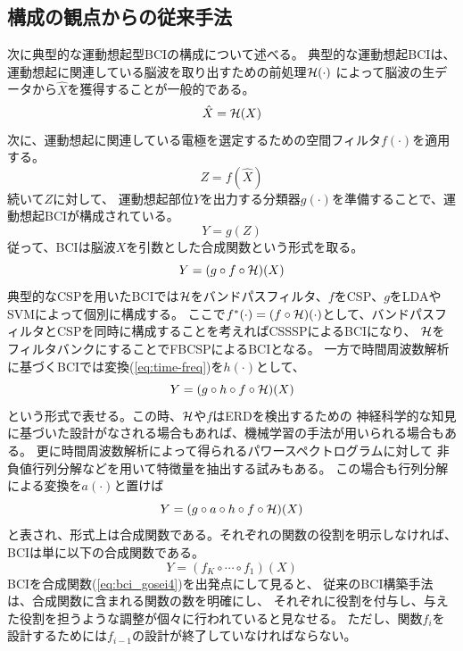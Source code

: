 \subsection{\mc 構成の観点からの従来手法}
次に典型的な運動想起型BCIの構成について述べる。
典型的な運動想起BCIは、運動想起に関連している脳波を取り出すための前処理\(\cal H(\cdot)\)
によって脳波の生データから\(\hat X\)を獲得することが一般的である。
\begin{equation}
    \hat X = {\cal H}(X)
    \label{eq:bandpass}
\end{equation}
次に、運動想起に関連している電極を選定するための空間フィルタ\(f(\cdot)\)を適用する。
\begin{equation}
    Z = f(\hat X)
    \label{eq:spatfilter}
\end{equation}
続いて\(Z\)に対して、
運動想起部位\(Y\)を出力する分類器\(g(\cdot)\)を準備することで、運動想起BCIが構成されている。
\begin{equation}
    Y = g(Z)
    \label{eq:classifier}
\end{equation}
従って、BCIは脳波\(X\)を引数とした合成関数という形式を取る。
\begin{equation}
    Y = (g\circ f \circ {\cal H})(X)
    \label{eq:bci_gosei}
\end{equation}
典型的なCSPを用いたBCIでは\(\cal H\)をバンドパスフィルタ、\(f\)をCSP、\(g\)をLDAやSVMによって個別に構成する。
ここで\(f^*(\cdot)=(f\circ{\cal H})(\cdot)\)として、バンドパスフィルタとCSPを同時に構成することを考えればCSSSPによるBCIになり、
\(\cal H\)をフィルタバンクにすることでFBCSPによるBCIとなる。
一方で時間周波数解析に基づくBCIでは変換(\ref{eq:time-freq})を\(h(\cdot)\)として、
\begin{equation}
    Y = (g\circ h \circ f \circ {\cal H})(X)
    \label{eq:bci_gosei2}
\end{equation}
という形式で表せる。この時、\(\cal H\)や\(f\)はERDを検出するための
神経科学的な知見に基づいた設計がなされる場合もあれば、機械学習の手法が用いられる場合もある。
更に時間周波数解析によって得られるパワースペクトログラムに対して
非負値行列分解などを用いて特徴量を抽出する試みもある\cite{kNMF,kNMF2}。
この場合も行列分解による変換を\(a(\cdot)\)と置けば
\begin{equation}
    Y = (g\circ a\circ h\circ f\circ {\cal H})(X)
    \label{eq:bci_gosei3}
\end{equation}
と表され、形式上は合成関数である。それぞれの関数の役割を明示しなければ、BCIは単に以下の合成関数である。
\begin{equation}
    Y = (f_K\circ \cdots \circ f_1)(X)
    \label{eq:bci_gosei4}
\end{equation}
BCIを合成関数(\ref{eq:bci_gosei4})を出発点にして見ると、
従来のBCI構築手法は、合成関数に含まれる関数の数を明確にし、
それぞれに役割を付与し、与えた役割を担うような調整が個々に行われていると見なせる。
ただし、関数\(f_i\)を設計するためには\(f_{i-1}\)の設計が終了していなければならない。

